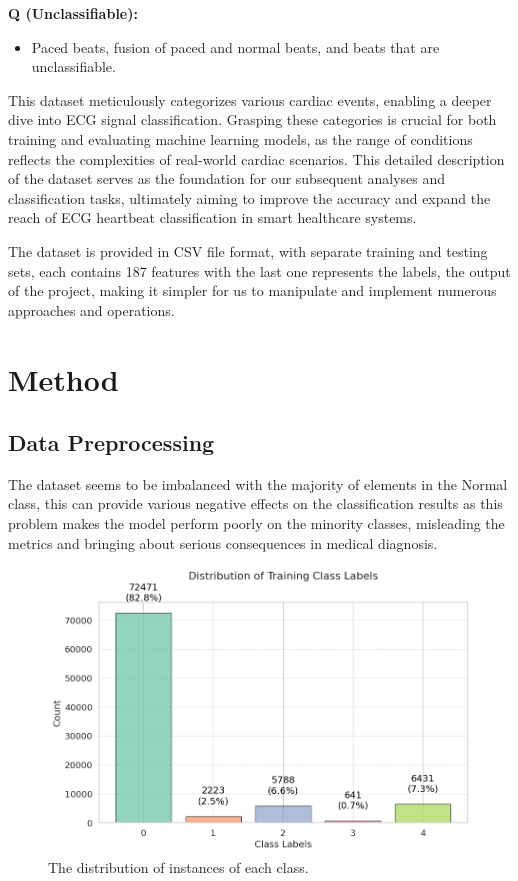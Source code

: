 \documentclass[]{acmsiggraph}
\begin{document}
\textbf{Q (Unclassifiable):}
\begin{itemize}
    \item Paced beats, fusion of paced and normal beats, and beats that are unclassifiable.
\end{itemize}

This dataset meticulously categorizes various cardiac events, enabling a deeper dive into ECG signal classification. Grasping these categories is crucial for both training and evaluating machine learning models, as the range of conditions reflects the complexities of real-world cardiac scenarios. This detailed description of the dataset serves as the foundation for our subsequent analyses and classification tasks, ultimately aiming to improve the accuracy and expand the reach of ECG heartbeat classification in smart healthcare systems.

The dataset is provided in CSV file format, with separate training and testing sets, each contains 187 features with the last one represents the labels, the output of the project, making it simpler for us to manipulate and implement numerous approaches and operations. 
\section{Method}
\subsection{Data Preprocessing}
The dataset seems to be imbalanced with the majority of elements in the Normal class, this can provide various negative effects on the classification results as this problem makes the model perform poorly on the minority classes, misleading the metrics and bringing about serious consequences in medical diagnosis.

\begin{figure}[h]\centering
 \includegraphics[width=0.75\linewidth]{images/dis_class.png}
 \caption{\label{fig:reference}The distribution of instances of each class.}
\end{figure}
\end{document}
